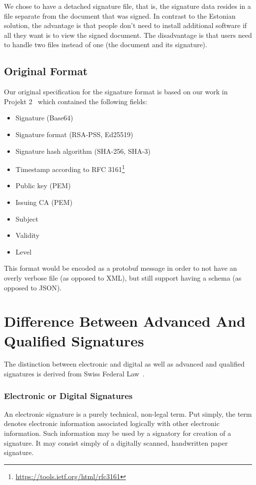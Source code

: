 We chose to have a detached signature file, that is,
the signature data resides in a file separate from the document that was signed.
In contrast to the Estonian solution,
the advantage is that people don't need to install additional software if all they want is to view the signed document.
The disadvantage is that users need to handle two files instead of one (the document and its signature).


\subsection{Original Format}\label{subsec:original-format}
Our original specification for the signature format is based on our work in Projekt 2~\cite{projekt2} which contained the following fields:

\begin{itemize}
    \item Signature (Base64)
    \item Signature format (\gls{RSA-PSS}, \gls{Ed25519})
    \item Signature hash algorithm (\gls{SHA-256}, \gls{SHA-3})
    \item Timestamp according to \gls{RFC} 3161\footnote{\url{https://tools.ietf.org/html/rfc3161}}
    \item Public key (\gls{PEM})
    \item Issuing \gls{CA} (\gls{PEM})
    \item Subject
    \item Validity
    \item Level
\end{itemize}

This format would be encoded as a protobuf message in order to not have an overly verbose file (as opposed to \gls{XML}),
but still support having a schema (as opposed to \gls{JSON}).

\section{Difference Between Advanced And Qualified Signatures}\label{subsec:difference-between-advanced-and-qualified-signatures}
The distinction between electronic and digital as well as advanced and qualified signatures is derived from Swiss Federal Law~\cite{zertes}.

\subsubsection{Electronic or Digital Signatures}
An electronic signature is a purely technical, non-legal term.
Put simply, the term denotes electronic information associated logically with other electronic information.
Such information may be used by a signatory for creation of a signature.
It may consist simply of a digitally scanned, handwritten paper signature.

